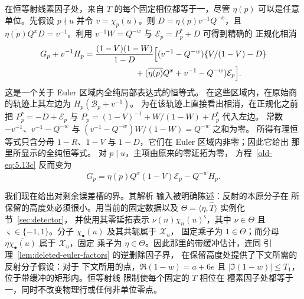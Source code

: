 在恒等射线素因子处，来自 $T$ 的每个固定相位都等于一，尽管
$\eta(p)$ 可以是任意单位。先假设 $p\nmid u$ 并令
$v=\chi_p(u)$。则 $D=\eta(p)v^{-1}Q^{-x}$，且
$\overline{\eta(p)}Q^xD=v^{-1}$。利用
$v^{-1}W=Q^{-w}$ 与 $\mathcal E_p=P_p^*+D$ 可得到精确的
正规化相消
\begin{equation}\label{old-eq:5.13b}
\begin{split}
 G_p+v^{-1}H_p={}&
 \frac{(1-V)(1-W)}{1-D}
 \Bigl[(v^{-1}-Q^{-w})\{V/(1-V)-D\}\\
 &\hspace{17mm}+(\overline{\eta(p)}Q^x+v^{-1}-Q^{-w})
                    \mathcal E_p\Bigr].
\end{split}
\end{equation}
这是一个关于 Euler 区域内全纯局部表达式的恒等式。
在这些区域内，在原始商的轨迹上其左边为
$H_p(\mathcal B_p+v^{-1})$。
为在该轨迹上直接看出相消，在正规化之前把
$P_p^*=-D+\mathcal E_p$ 与
$P_p=(1-V)^{-1}+W/(1-W)+P_p^*$ 代入左边。
常数 $-v^{-1}$、$v^{-1}-Q^{-w}$ 与
$(v^{-1}-Q^{-w})W/(1-W)=Q^{-w}$ 之和为零。
所得有理恒等式只含分母 $1-R$、$1-V$
与 $1-D$，它们在 Euler 区域内非零；因此它给出
那里所显示的全纯恒等式。
对 $p\mid u$，主项由原来的零延拓为零，
方程~\eqref{old-eq:5.13c} 反而变为
\[
 G_p=
 \overline{\eta(p)}Q^x(1-V)\mathcal E_p-Q^{-w}H_p.
\]

我们现在给出对剩余误差槽的界。其解析
输入被明确陈述：反射的本原分子在
所保留的高度处必须很小。用当前的固定数据以及
$\Theta=\langle\eta,\widehat T\rangle$ 实例化节~\ref{sec:detector}，
并使用其零延拓表示 $\nu(n)\chi_n(u)^\varsigma$，其中
$\nu\in\Theta$ 且 $\varsigma\in\{-1,1\}$。分子
$\chi_\bullet(u)$ 及其共轭属于 $\mathcal X_u$，
固定乘子为 $1\in\Theta$；而分母
$\eta\overline{\chi_\bullet(u)}$ 属于 $\mathcal X_u$，固定
乘子为 $\eta\in\Theta$。因此那里的带缓冲估计，连同
引理~\ref{lem:deleted-euler-factors} 的逆删除因子界，
在保留高度处提供了下文所需的反射分子假设：对于
下文所用的点，$\Re(1-w)=a+6e$ 且
$|\Im(1-w)|\le T_1$，位于带缓冲的矩形内。恒等射线
限制使每个固定的 $T$ 相位在
槽素因子处都等于一，同时不改变物理行或任何非单位零点。

